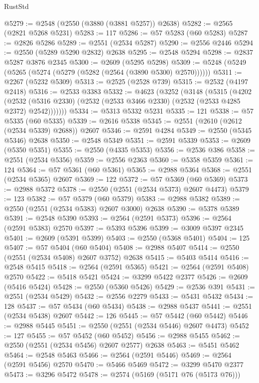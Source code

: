 \begin{lexlean}{RustStd}
\begin{coremodule}
@5279 := @2548 (@2550 (@3880 (@3881 @5257)) @2638)
@5282 := @2565 (@2821 @5268 @5231)
@5283 := 117
@5286 := @57 @5283 (@60 @5283)
@5287 := @2826 @5286
@5289 := @2551 (@2534 @5287)
@5290 := @2556 @2446
@5294 := @2550 (@5289 @5290 @2832) @2638
@5295 := @2548 @5294
@5298 := @2837 @5287 @3876 @2345
@5300 := @2609 (@5295 @5298)
@5309 := @5248 (@5249 (@5265 (@5274 (@5279 (@5282 (@2564 (@3890 @5300) @2570))))))
@5311 := @2267 (@5232 @5309)
@5313 := @2525 (@2528 @739)
@5315 := @2532 (@4197 @2418)
@5316 := @2533 @3383
@5332 := @4623
    (@3252
      (@3148
        (@5315
          (@4202
            (@2532 (@5316 @2330) (@2532 (@2533 @3466 @2330) (@2532 (@2533 @4285 @2372) @2542)))))))
@5334 := @5313 @5332 @5231
@5335 := 121
@5338 := @57 @5335 (@60 @5335)
@5339 := @2616 @5338
@5345 := @2551 (@2610 (@2612 (@2534 @5339) @2688)) @2607
@5346 := @2591 @4284
@5349 := @2550 (@5345 @5346) @2638
@5350 := @2548 @5349
@5351 := @2591 @5339
@5353 := @2609 (@5350 @5351)
@5355 := @2550 (@4335 @5353)
@5356 := @2536 @386
@5358 := @2551 (@2534 @5356)
@5359 := @2556 @2363
@5360 := @5358 @5359
@5361 := 124
@5364 := @57 @5361 (@60 @5361)
@5365 := @2988 @5364
@5368 := @2551 (@2534 @5365) @2607
@5369 := 122
@5372 := @57 @5369 (@60 @5369)
@5373 := @2988 @5372
@5378 := @2550 (@2551 (@2534 @5373) @2607 @4473)
@5379 := 123
@5382 := @57 @5379 (@60 @5379)
@5383 := @2988 @5382
@5389 := @2550 (@2551 (@2534 @5383) @2607 @3000) @2638
@5390 := @5378 @5389
@5391 := @2548 @5390
@5393 := @2564 (@2591 @5373)
@5396 := @2564 (@2591 @5383) @2570
@5397 := @5393 @5396
@5399 := @3009 @5397 @2345
@5401 := @2609 (@5391 @5399)
@5403 := @2550 (@5368 @5401)
@5404 := 125
@5407 := @57 @5404 (@60 @5404)
@5408 := @2988 @5407
@5414 := @2550 (@2551 (@2534 @5408) @2607 @3752) @2638
@5415 := @5403 @5414
@5416 := @2548 @5415
@5418 := @2564 (@2591 @5365)
@5421 := @2564 (@2591 @5408) @2570
@5422 := @5418 @5421
@5424 := @3299 @5422 @2377
@5426 := @2609 (@5416 @5424)
@5428 := @2550 (@5360 @5426)
@5429 := @2536 @391
@5431 := @2551 (@2534 @5429)
@5432 := @2556 @2279
@5433 := @5431 @5432
@5434 := 128
@5437 := @57 @5434 (@60 @5434)
@5438 := @2988 @5437
@5441 := @2551 (@2534 @5438) @2607
@5442 := 126
@5445 := @57 @5442 (@60 @5442)
@5446 := @2988 @5445
@5451 := @2550 (@2551 (@2534 @5446) @2607 @4473)
@5452 := 127
@5455 := @57 @5452 (@60 @5452)
@5456 := @2988 @5455
@5462 := @2550 (@2551 (@2534 @5456) @2607 @2577) @2638
@5463 := @5451 @5462
@5464 := @2548 @5463
@5466 := @2564 (@2591 @5446)
@5469 := @2564 (@2591 @5456) @2570
@5470 := @5466 @5469
@5472 := @3299 @5470 @2377
@5473 := @3296 @5472
@5478 := @2574 (@5169 (@5171 @76 (@5173 @76)))

\end{coremodule}
\end{lexlean}
